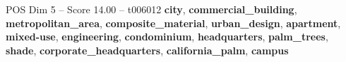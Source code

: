 \begin{textsample}{POS Dim 5 – Score 14.00 – t006012}  \label{ex:f5_pos_036}
\textbf{city}, \textbf{commercial\_building}, \textbf{metropolitan\_area}, \textbf{composite\_material}, \textbf{urban\_design}, \textbf{apartment}, \textbf{mixed-use}, \textbf{engineering}, \textbf{condominium}, \textbf{headquarters}, \textbf{palm\_trees}, \textbf{shade}, \textbf{corporate\_headquarters}, \textbf{california\_palm}, \textbf{campus}

\end{textsample}
